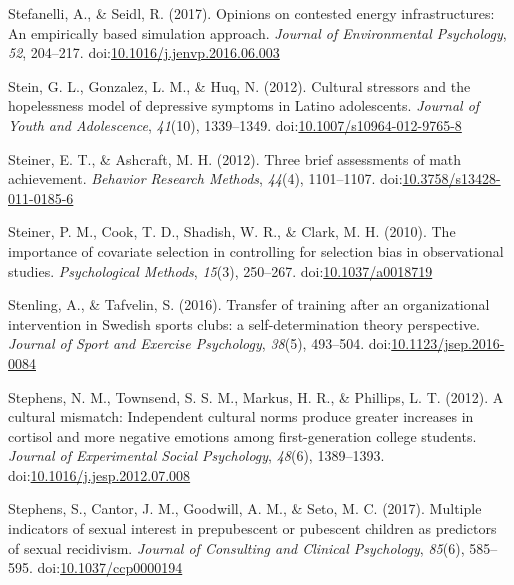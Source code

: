 \documentclass[english,man]{apa6}
\theoremstyle{definition}
\theoremstyle{definition}
\theoremstyle{definition}
\theoremstyle{remark}
\begin{document}
\hypertarget{ref-Stefanelli2017}{}
Stefanelli, A., \& Seidl, R. (2017). Opinions on contested energy
infrastructures: An empirically based simulation approach. \emph{Journal
of Environmental Psychology}, \emph{52}, 204--217.
doi:\href{https://doi.org/10.1016/j.jenvp.2016.06.003}{10.1016/j.jenvp.2016.06.003}

\hypertarget{ref-Stein2012}{}
Stein, G. L., Gonzalez, L. M., \& Huq, N. (2012). Cultural stressors and
the hopelessness model of depressive symptoms in Latino adolescents.
\emph{Journal of Youth and Adolescence}, \emph{41}(10), 1339--1349.
doi:\href{https://doi.org/10.1007/s10964-012-9765-8}{10.1007/s10964-012-9765-8}

\hypertarget{ref-Steiner2012}{}
Steiner, E. T., \& Ashcraft, M. H. (2012). Three brief assessments of
math achievement. \emph{Behavior Research Methods}, \emph{44}(4),
1101--1107.
doi:\href{https://doi.org/10.3758/s13428-011-0185-6}{10.3758/s13428-011-0185-6}

\hypertarget{ref-Steiner2010}{}
Steiner, P. M., Cook, T. D., Shadish, W. R., \& Clark, M. H. (2010). The
importance of covariate selection in controlling for selection bias in
observational studies. \emph{Psychological Methods}, \emph{15}(3),
250--267. doi:\href{https://doi.org/10.1037/a0018719}{10.1037/a0018719}

\hypertarget{ref-Stenling2016}{}
Stenling, A., \& Tafvelin, S. (2016). Transfer of training after an
organizational intervention in Swedish sports clubs: a
self-determination theory perspective. \emph{Journal of Sport and
Exercise Psychology}, \emph{38}(5), 493--504.
doi:\href{https://doi.org/10.1123/jsep.2016-0084}{10.1123/jsep.2016-0084}

\hypertarget{ref-Stephens2012}{}
Stephens, N. M., Townsend, S. S. M., Markus, H. R., \& Phillips, L. T.
(2012). A cultural mismatch: Independent cultural norms produce greater
increases in cortisol and more negative emotions among first-generation
college students. \emph{Journal of Experimental Social Psychology},
\emph{48}(6), 1389--1393.
doi:\href{https://doi.org/10.1016/j.jesp.2012.07.008}{10.1016/j.jesp.2012.07.008}

\hypertarget{ref-Stephens2017a}{}
Stephens, S., Cantor, J. M., Goodwill, A. M., \& Seto, M. C. (2017).
Multiple indicators of sexual interest in prepubescent or pubescent
children as predictors of sexual recidivism. \emph{Journal of Consulting
and Clinical Psychology}, \emph{85}(6), 585--595.
doi:\href{https://doi.org/10.1037/ccp0000194}{10.1037/ccp0000194}
\end{document}
